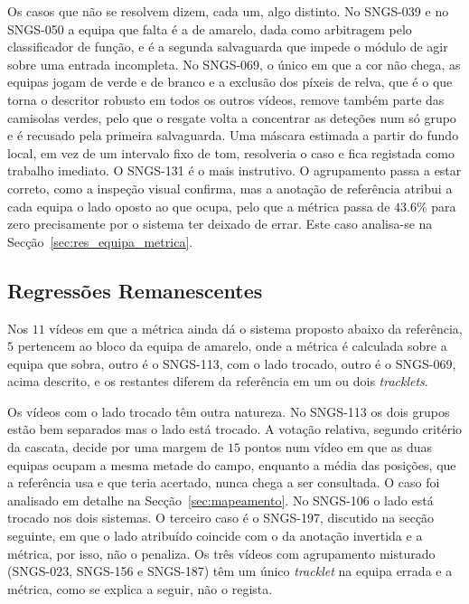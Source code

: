 Os casos que não se resolvem dizem, cada um, algo distinto. No SNGS-039 e no SNGS-050 a equipa que
falta é a de amarelo, dada como arbitragem pelo classificador de função, e é a segunda salvaguarda
que impede o módulo de agir sobre uma entrada incompleta. No SNGS-069, o único em que a cor não
chega, as equipas jogam de verde e de branco e a exclusão dos píxeis de relva, que é o que torna o
descritor robusto em todos os outros vídeos, remove também parte das camisolas verdes, pelo que o
resgate volta a concentrar as deteções num só grupo e é recusado pela primeira salvaguarda. Uma
máscara estimada a partir do fundo local, em vez de um intervalo fixo de tom, resolveria o caso e
fica registada como trabalho imediato. O SNGS-131 é o mais instrutivo. O agrupamento passa a estar
correto, como a inspeção visual confirma, mas a anotação de referência atribui a cada equipa o lado
oposto ao que ocupa, pelo que a métrica passa de $43.6\%$ para zero precisamente por o sistema ter
deixado de errar. Este caso analisa-se na Secção~\ref{sec:res_equipa_metrica}.

\subsection{Regressões Remanescentes}\label{sec:res_equipa_regressoes}

Nos $11$ vídeos em que a métrica ainda dá o sistema proposto abaixo da referência,
$5$ pertencem ao bloco da equipa de amarelo, onde a métrica é calculada sobre a equipa
que sobra, outro é o SNGS-113, com o lado trocado, outro é o SNGS-069, acima descrito, e os restantes
diferem da referência em um ou dois \emph{tracklets}.

Os vídeos com o lado trocado têm outra natureza. No SNGS-113 os dois grupos estão bem
separados mas o lado está trocado. A votação relativa, segundo critério da cascata, decide por uma margem de
$15$ pontos num vídeo em que as duas equipas ocupam a mesma metade do campo, enquanto a média das
posições, que a referência usa e que teria acertado, nunca chega a ser consultada. O caso foi
analisado em detalhe na Secção~\ref{sec:mapeamento}. No SNGS-106 o lado está trocado nos dois
sistemas. O terceiro caso é o SNGS-197, discutido na secção seguinte, em que o lado atribuído
coincide com o da anotação invertida e a métrica, por isso, não o penaliza. Os três vídeos com agrupamento misturado (SNGS-023, SNGS-156 e SNGS-187) têm um único
\emph{tracklet} na equipa errada e a métrica, como se explica a seguir, não o regista.

